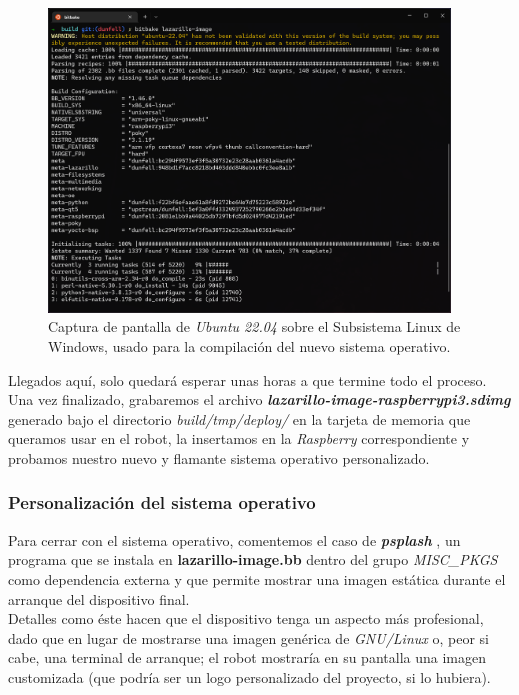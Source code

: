 \begin{figure}[h]
	\centering
	\includegraphics[width=0.95\textwidth]{imagenes/lazarillo-image-compilation.png}
	\caption{Captura de pantalla de \textit{Ubuntu 22.04} sobre el Subsistema Linux de Windows, usado para la compilación del nuevo sistema operativo.}
	\label{lazarillo-image-compilation}
\end{figure}

Llegados aquí, solo quedará esperar unas horas a que termine todo el proceso. Una vez finalizado, grabaremos el archivo \textbf{\textit{lazarillo-image-raspberrypi3.sdimg}} generado bajo el directorio \emph{build/tmp/deploy/} en la tarjeta de memoria que queramos usar en el robot, la insertamos en la \textit{Raspberry} correspondiente y probamos nuestro nuevo y flamante sistema operativo personalizado.\\


\subsubsection{Personalización del sistema operativo}

Para cerrar con el sistema operativo, comentemos el caso de \textbf{\textit{psplash}} \cite{psplash}, un programa que se instala en \textbf{lazarillo-image.bb} dentro del grupo \emph{MISC\_PKGS} como dependencia externa y que permite mostrar una imagen estática durante el arranque del dispositivo final.\\

Detalles como éste hacen que el dispositivo tenga un aspecto más profesional, dado que en lugar de mostrarse una imagen genérica de \textit{GNU/Linux} o, peor si cabe, una terminal de arranque; el robot mostraría en su pantalla una imagen customizada (que podría ser un logo personalizado del proyecto, si lo hubiera).\\

